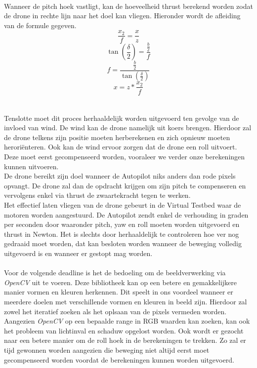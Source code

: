 \\
Wanneer de pitch hoek vastligt, kan de hoeveelheid thrust berekend worden zodat de drone in rechte lijn naar het doel kan vliegen. Hieronder wordt de afleiding van de formule gegeven.
\\
\begin{equation} \label{eq:RelatieveVerticaleHoekBegin}
\frac{x_2}{f} = \frac{x}{z}
\end{equation}
\begin{equation} 
\tan(\frac{\delta}{2}) = \frac{\frac{b}{2}}{f}
\end{equation}
\begin{equation} 
f = \frac{\frac{b}{2}}{\tan(\frac{\delta}{2})}
\end{equation}
\begin{equation} \label{eq:RelatieveVerticaleHoekBeginEind}
x = z * \frac{x_2}{f}	
\end{equation}
\\
\\
Tenslotte moet dit proces herhaaldelijk worden uitgevoerd ten gevolge van de invloed van wind. De wind kan de drone namelijk uit koers brengen. Hierdoor zal de drone telkens zijn positie moeten herberekenen en zich opnieuw moeten herori\"enteren. Ook kan de wind ervoor zorgen dat de drone een roll uitvoert. Deze moet eerst gecompenseerd worden, vooraleer we verder onze berekeningen kunnen uitvoeren.
\\
De drone bereikt zijn doel wanneer de Autopilot niks anders dan rode pixels opvangt. De drone zal dan de opdracht krijgen om zijn pitch te compenseren en vervolgens enkel via thrust de zwaartekracht tegen te werken.
\\
Het effectief laten vliegen van de drone gebeurt in de Virtual Testbed waar de motoren worden aangestuurd. De Autopilot zendt enkel de verhouding in graden per seconden door waaronder pitch, yaw en roll moeten worden uitgevoerd en thrust in Newton. Het is slechts door herhaaldelijk te controleren hoe ver nog gedraaid moet worden, dat kan besloten worden wanneer de beweging volledig uitgevoerd is en wanneer er gestopt mag worden.
\\
\\
Voor de volgende deadline is het de bedoeling om de beeldverwerking via \textit{OpenCV} uit te voeren. Deze bibliotheek kan op een betere en gemakkelijkere manier vormen en kleuren herkennen. Dit speelt in ons voordeel wanneer er meerdere doelen met verschillende vormen en kleuren in beeld zijn. Hierdoor zal zowel het iteratief zoeken als het oplsaan van de pixels vermeden worden. Aangezien \textit{OpenCV} op een bepaalde range in RGB waarden kan zoeken, kan ook het probleem van lichtinval en schaduw opgelost worden.
Ook wordt er gezocht naar een betere manier om de roll hoek in de berekeningen te trekken. Zo zal er tijd gewonnen worden aangezien die beweging niet altijd eerst moet gecompenseerd worden voordat de berekeningen kunnen worden uitgevoerd. 